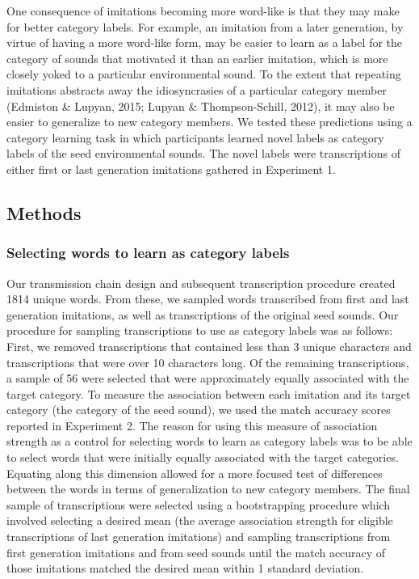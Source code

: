 \documentclass[english,floatsintext,man]{apa6}
\theoremstyle{definition}
\theoremstyle{definition}
\theoremstyle{remark}
\begin{document}
One consequence of imitations becoming more word-like is that they may
make for better category labels. For example, an imitation from a later
generation, by virtue of having a more word-like form, may be easier to
learn as a label for the category of sounds that motivated it than an
earlier imitation, which is more closely yoked to a particular
environmental sound. To the extent that repeating imitations abstracts
away the idiosyncrasies of a particular category member (Edmiston \&
Lupyan, 2015; Lupyan \& Thompson-Schill, 2012), it may also be easier to
generalize to new category members. We tested these predictions using a
category learning task in which participants learned novel labels as
category labels of the seed environmental sounds. The novel labels were
transcriptions of either first or last generation imitations gathered in
Experiment 1.

\subsection{Methods}\label{methods-2}

\subsubsection{Selecting words to learn as category
labels}\label{selecting-words-to-learn-as-category-labels}

Our transmission chain design and subsequent transcription procedure
created 1814 unique words. From these, we sampled words transcribed from
first and last generation imitations, as well as transcriptions of the
original seed sounds. Our procedure for sampling transcriptions to use
as category labels was as follows: First, we removed transcriptions that
contained less than 3 unique characters and transcriptions that were
over 10 characters long. Of the remaining transcriptions, a sample of 56
were selected that were approximately equally associated with the target
category. To measure the association between each imitation and its
target category (the category of the seed sound), we used the match
accuracy scores reported in Experiment 2. The reason for using this
measure of association strength as a control for selecting words to
learn as category labels was to be able to select words that were
initially equally associated with the target categories. Equating along
this dimension allowed for a more focused test of differences between
the words in terms of generalization to new category members. The final
sample of transcriptions were selected using a bootstrapping procedure
which involved selecting a desired mean (the average association
strength for eligible transcriptions of last generation imitations) and
sampling transcriptions from first generation imitations and from seed
sounds until the match accuracy of those imitations matched the desired
mean within 1 standard deviation.
\end{document}
